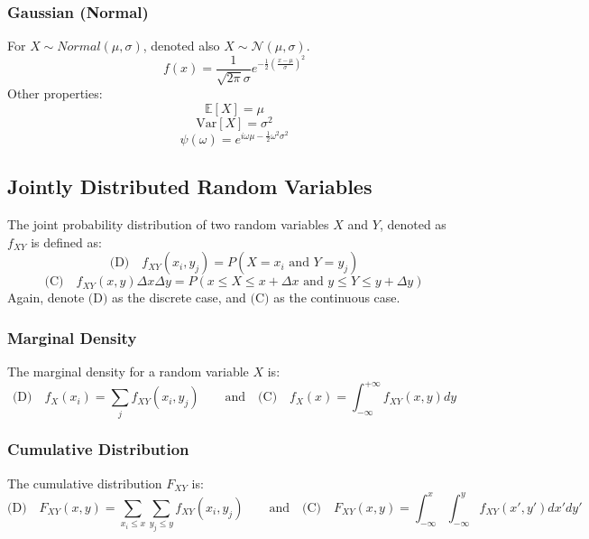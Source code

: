 \documentclass[twoside,twocolumn]{article}
\begin{document}
\subsubsection{Gaussian (Normal)}
For $X\sim Normal(\mu, \sigma)$, denoted also $X \sim \mathcal{N}(\mu, \sigma)$.
\begin{equation}
  \displaystyle f(x)=\frac{1}{\sqrt{2\pi}\sigma}e^{-\frac{1}{2}\left(\frac{x-\mu}{\sigma}\right)^2}
\end{equation}
Other properties:
\begin{equation}
  \mathbb { E }[X] = \mu
\end{equation}
\begin{equation}
  \mbox{Var}[X] = \sigma^2
\end{equation}
\begin{equation}
  \psi(\omega) = e^{i\omega\mu-\frac{1}{2}\omega^2\sigma^2}
\end{equation}
\subsection{Jointly Distributed Random Variables}
The joint probability distribution of two random variables $X$ and $Y$, denoted
as $f_{XY}$ is defined as:
\begin{equation}
  \mbox{(D)}\quad f_{XY}(x_i,y_j)=P(X=x_i\mbox{ and }Y=y_j)
\end{equation}
\begin{equation}
  \mbox{(C)}\quad f_{XY}(x,y)\Delta x\Delta y=P(x\leqslant X\leqslant x+\Delta x\mbox{ and }y\leqslant Y\leqslant y+\Delta y)
\end{equation}
Again, denote $\mbox{(D)}$ as the discrete case, and $\mbox{(C)}$ as the
continuous case.
\subsubsection{Marginal Density}
The marginal density for a random variable $X$ is:
\begin{equation}
  \mbox{(D)}\quad f_X(x_i)=\sum_{j}f_{XY}(x_i,y_j) \quad\quad\mbox{and}\quad\mbox{(C)}\quad f_X(x)=\int_{-\infty}^{+\infty}f_{XY}(x,y)dy
\end{equation}
\subsubsection{Cumulative Distribution}
The cumulative distribution $F_{XY}$ is:
\begin{equation}
  \mbox{(D)}\quad F_{XY}(x,y)=\sum_{x_i\leqslant x}\sum_{y_j\leqslant y}f_{XY}(x_i,y_j) \quad\quad\mbox{and}\quad\mbox{(C)}\quad F_{XY}(x,y)=\int_{-\infty}^x\int_{-\infty}^yf_{XY}(x',y')dx'dy'
\end{equation}
\end{document}

